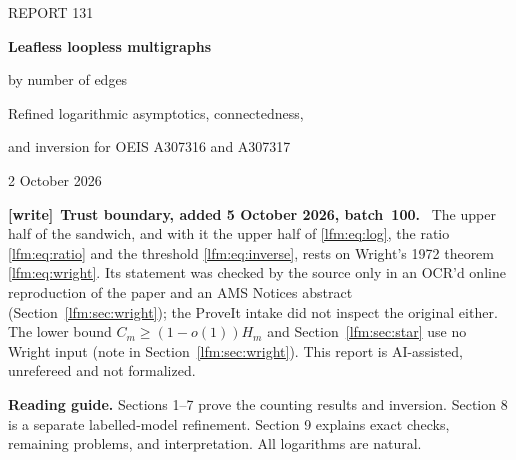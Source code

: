 \documentclass[11pt,letterpaper]{article}
\theoremstyle{remark}\newtheorem{remark}[theorem]{Remark}
\newenvironment{writenote}[1][]{\par\smallskip\begingroup\small
 \noindent\textbf{[write]}\if\relax\detokenize{#1}\relax\else~\textbf{#1.}\fi\ }%
 {\par\endgroup\smallskip}
\begin{document}
\thispagestyle{empty}
\begin{center}
{\small\sffamily REPORT 131}\par\vspace{12pt}
{\LARGE\bfseries Leafless loopless multigraphs\par by number of edges}\par\vspace{10pt}
{\large Refined logarithmic asymptotics, connectedness,\par and inversion for OEIS A307316 and A307317}\par\vspace{12pt}
{2 October 2026}
\end{center}
\vspace{8pt}
\begin{abstract}
Let $A_m$ and $C_m$ count isomorphism classes of loopless multigraphs with $m$ edges and minimum degree at least two, with $C_m$ restricted to connected graphs. Both vertices and edges are unlabelled. With $w=W(2m)$ and
\[
 F(m)=m\left(w-\log w-1+\frac2w\right),\qquad
 H_m=\frac{\exp\{F(m)+w^2/4-3w/2-1\}}
 {\sqrt{2\pi m(w+1)}},
\]
we prove the polynomial sandwich
\[
 (1-o(1))H_m\le C_m\le A_m\le(1+o(1))e^wH_m.
\]
It yields $\log a_m=F(m)+w^2/4+O(\log m)$ for either sequence, all fixed inverse-logarithmic orders, and an implicit first-threshold inverse with additive error $O(1)$. A separate component convolution proves $C_m/A_m=1-O(w^3/m)$ directly for isomorphism classes. An elementary star-conditioning argument also gives a relative minimum-degree probability in the vertex-labelled, exact-total composition model. These statements do not establish $A_m\sim H_m$.

The only non-elementary enumeration input is Wright's classical simple-graph theorem. Its statement was checked in reproduced primary text and corroborated by an official contemporary abstract; the original 1972 scan and full 1974 proof were not obtained. No historical priority claim is made. Exact finite checks and a reproducible source package supplement the proofs; they do not certify the asymptotic theorem.
\end{abstract}

\begin{writenote}[Trust boundary, added 5 October 2026, batch~100]
The upper half of the sandwich, and with it the upper half of
\eqref{lfm:eq:log}, the ratio \eqref{lfm:eq:ratio} and the threshold
\eqref{lfm:eq:inverse}, rests on Wright's 1972 theorem \eqref{lfm:eq:wright}.
Its statement was checked by the source only in an OCR'd online reproduction
of the paper and an AMS Notices abstract (Section~\ref{lfm:sec:wright}); the
ProveIt intake did not inspect the original either. The lower bound
$C_m\ge(1-o(1))H_m$ and Section~\ref{lfm:sec:star} use no Wright input
(note in Section~\ref{lfm:sec:wright}). This report is AI-assisted,
unrefereed and not formalized.
\end{writenote}
\vfill
\noindent\textbf{Reading guide.} Sections 1--7 prove the counting results and inversion. Section 8 is a separate labelled-model refinement. Section 9 explains exact checks, remaining problems, and interpretation. All logarithms are natural.
\newpage
\tableofcontents
\newpage
\end{document}
